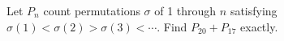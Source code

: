 Let $ P_n $ count permutations $\sigma $ of 1 through $ n $ satisfying $\sigma(1)<\sigma(2)>\sigma(3)<\cdots $. Find $ P_{20}+P_{17}$ exactly.
